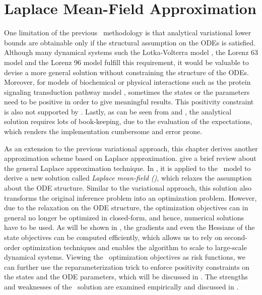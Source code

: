 \chapter{Laplace Mean-Field Approximation}
\label{ch-laplace-approximation}

One limitation of the previous \algovgmgp\ methodology is that analytical variational lower bounds are obtainable only if the structural assumption on the ODEs is satisfied.
Although many dynamical systems such the Lotka-Volterra model , the Lorenz 63 model  and the Lorenz 96 model  fulfill this requirement, it would be valuable to devise a more general solution without constraining the structure of the ODEs.
Moreover, for models of biochemical or physical interactions such as the protein signaling transduction pathway model , sometimes the states or the parameters need to be positive in order to give meaningful results.
This positivity constraint is also not supported by  \algovgmgp.
Lastly, as can be seen from  and , the analytical solution requires lots of book-keeping, due to the evaluation of the expectations, which renders the implementation cumbersome and error prone.

As an extension to the previous variational approach, this chapter derives another approximation scheme based on Laplace approximation.
 give a brief review about the general Laplace approximation technique.
In , it is applied to the \algovgmgp\ model to derive a new solution called \emph{Laplace mean-field (\algolpmf)}, which relaxes the assumption about the ODE structure.
Similar to the variational approach, this solution also transforms the original inference problem into an optimization problem.
However, due to the relaxation on the ODE structure, the optimization objectives can in general no longer be optimized in closed-form, and hence, numerical solutions have to be used.
As will be shown in , the gradients and even the Hessians of the state objectives can be computed efficiently, which allows us to rely on second-order optimization techniques and enables the algorithm to scale to large-scale dynamical systems.
Viewing the \algolpmf\ optimization objectives as risk functions, we can further use the reparameterization trick to enforce positivity constraints on the states and the ODE parameters, which will be discussed in .
The strengths and weaknesses of the \algolpmf\ solution are examined empirically and discussed in .



